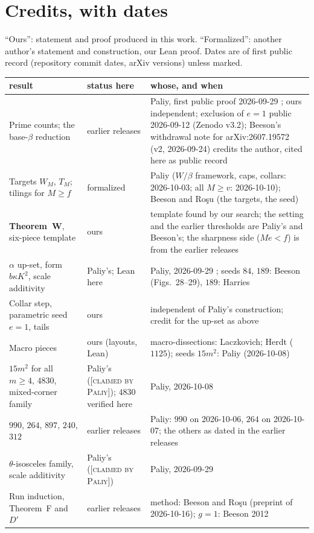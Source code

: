 \documentclass[11pt,reqno]{amsart}
\theoremstyle{plain}
\theoremstyle{definition}
\newcommand{\lab}[1]{\textup{[\textsc{#1}]}}
\newcommand{\CP}{\lab{claimed by Paliy}}
\begin{document}
\section{Credits, with dates}\label{sec:credits}
``Ours'': statement and proof produced in this work. ``Formalized'': another author's statement and construction, our Lean proof. Dates are of first public record (repository commit dates, arXiv versions) unless marked.
\begin{center}
\small
\begin{tabular}{@{}p{4.4cm}p{1.8cm}p{6.4cm}@{}}
\toprule
result & status here & whose, and when\\
\midrule
Prime counts; the base-$\beta$ reduction & earlier releases & Paliy, first public proof 2026-09-29 \cite{PaliyPrime}; ours independent; exclusion of $e=1$ public 2026-09-12 (Zenodo v3.2); Beeson's withdrawal note for arXiv:2607.19572 (v2, 2026-09-24) \cite{BeesonWithdrawn} credits the author, cited here as public record\\
Targets $W_M$, $T_M$; tilings for $M\ge f$ & formalized & Paliy ($W/\beta$ framework, caps, collars: 2026-10-03; all $M\ge v$: 2026-10-10); Beeson and Ro\c{s}u (the targets, the seed)\\
\textbf{Theorem~W}, six-piece template & ours & template found by our search; the setting and the earlier thresholds are Paliy's and Beeson's; the sharpness side ($Me<f$) is from the earlier releases\\
$\alpha$ up-set, form $b\kappa K^2$, scale additivity & Paliy's; Lean here & Paliy, 2026-09-29 \cite{PaliyRepo}; seeds $84$, $189$: Beeson (Figs.~28--29), $189$: Harries\\
Collar step, parametric seed $e=1$, tails & ours & independent of Paliy's construction; credit for the up-set as above\\
Macro pieces & ours (layouts, Lean) & macro-dissections: Laczkovich; Herdt ($1125$); seeds $15m^2$: Paliy (2026-10-08)\\
$15m^2$ for all $m\ge4$, $4830$, mixed-corner family & Paliy's (\CP{}); $4830$ verified here & Paliy, 2026-10-08\\
$990$, $264$, $897$, $240$, $312$ & earlier releases & Paliy: $990$ on 2026-10-06, $264$ on 2026-10-07; the others as dated in the earlier releases\\
$\theta$-isosceles family, scale additivity & Paliy's (\CP{}) & Paliy, 2026-09-29\\
Run induction, Theorem~F and $D'$ & earlier releases & method: Beeson and Ro\c{s}u (preprint of 2026-10-16); $g=1$: Beeson 2012\\

\end{tabular}
\end{center}
\end{document}
